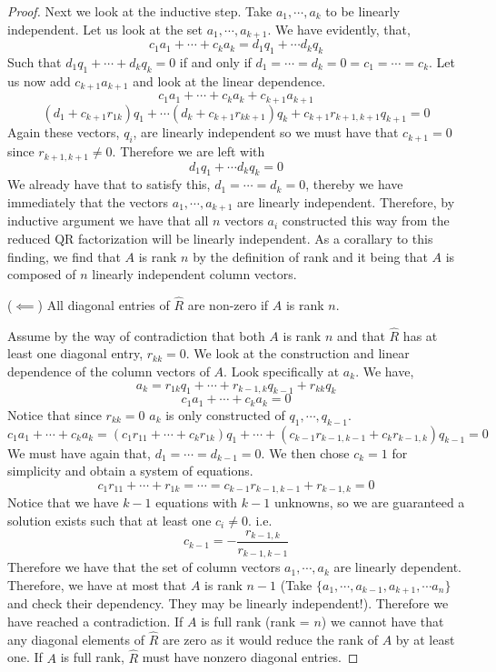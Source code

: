\documentclass{article}
\begin{document}
\begin{enumerate}
\begin{enumerate}
\begin{proof}
    Next we look at the inductive step. Take $a_1, \cdots, a_k$ to be linearly independent. Let us look at the set $a_1, \cdots, a_{k+1}$. We have evidently, that, 
    \[
        c_1a_1 + \cdots + c_ka_k = d_1q_1 + \cdots d_kq_k
    \]
    Such that $d_1q_1 + \cdots + d_kq_k = 0$ if and only if $d_1 = \cdots = d_k = 0 = c_1 = \cdots = c_k$. Let us now add $c_{k+1}a_{k+1}$ and look at the linear dependence. 
    \[
        c_1a_1 + \cdots + c_ka_k + c_{k+1}a_{k+1} \] \[(d_1 + c_{k+1}r_{1k})q_1 + \cdots (d_k+c_{k+1}r_{kk+1})q_k + c_{k+1}r_{k+1, k+1}q_{k+1} = 0
    \]
        Again these vectors, $q_i$, are linearly independent so we must have that $c_{k+1} = 0$ since $r_{k+1, k+1} \neq 0$. Therefore we are left with 
    \[
        d_1q_1 + \cdots d_kq_k = 0
    \]
    We already have that to satisfy this, $d_1 = \cdots = d_k = 0$, thereby we have immediately that the vectors $a_1, \cdots, a_{k+1}$ are linearly independent. Therefore, by inductive argument we have that all $n$ vectors $a_i$ constructed this way from the reduced QR factorization will be linearly independent. As a corallary to this finding, we find that $A$ is rank $n$ by the definition of rank and it being that $A$ is composed of $n$ linearly independent column vectors. 
    \vspace{10pt}

    ($\impliedby$) All diagonal entries of $\hat{R}$ are non-zero if $A$ is rank $n$. 

    Assume by the way of contradiction that both $A$ is rank $n$ and that $\hat{R}$ has at least one diagonal entry, $r_{kk} = 0$. 
    We look at the construction and linear dependence of the column vectors of $A$. Look specifically at $a_k$. We have, 
    \[
        a_k = r_{1k} q_1 + \cdots + r_{k-1, k} q_{k-1} + r_{kk} q_k
    \]
    \[
        c_1a_1 + \cdots + c_ka_k = 0
    \]
    Notice that since $r_{kk} = 0$ $a_k$ is only constructed of $q_1, \cdots, q_{k-1}$. 
    \[
        c_1a_1 + \cdots + c_ka_k = (c_1r_{11} + \cdots + c_kr_{1k})q_1 + \cdots + (c_{k-1}r_{k-1, k-1} + c_kr_{k-1, k})q_{k-1} = 0 
    \]
    We must have again that, $d_1 = \cdots = d_{k-1} = 0$. We then chose $c_k = 1$ for simplicity and obtain a system of equations.
    \[
        c_1r_{11} + \cdots + r_{1k} = \cdots =  c_{k-1}r_{k-1, k-1} + r_{k-1, k} = 0
    \]
    Notice that we have $k-1$ equations with $k-1$ unknowns, so we are guaranteed a solution exists such that at least one $c_i \neq 0$. i.e. 
    \[
        c_{k-1} = -\frac{r_{k-1, k}}{r_{k-1, k-1}} 
    \]
    Therefore we have that the set of column vectors $a_1,\cdots, a_k$ are linearly dependent. Therefore, we have at most that $A$ is rank $n-1$ (Take $\{a_1, \cdots, a_{k-1}, a_{k+1}, \cdots a_n\}$ and check their dependency. They may be linearly independent!). Therefore we have reached a contradiction. If $A$ is full rank (rank = $n$) we cannot have that any diagonal elements of $\hat{R}$ are zero as it would reduce the rank of $A$ by at least one. If $A$ is full rank, $\hat{R}$ must have nonzero diagonal entries. 


\end{proof}
\end{enumerate}
\end{enumerate}
\end{document}
